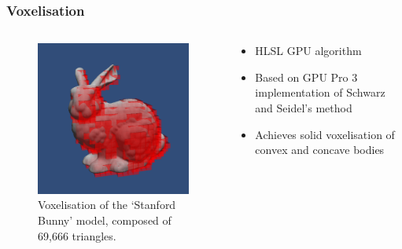 \documentclass{beamer}
\begin{document}
	\begin{frame}
	\frametitle{Voxelisation}
		\begin{columns}[T] %
			\begin{column}[T]{5cm} %
				\begin{figure}
					\centerline{\includegraphics[scale=0.4]{Voxelise.png}}
					\caption{Voxelisation of the `Stanford Bunny' model, composed of 69,666 triangles.}
				\end{figure}
			\end{column}
			\begin{column}[T]{5cm} %
				\begin{itemize}
				\item{HLSL GPU algorithm}
				\item{Based on GPU Pro 3 implementation of Schwarz and Seidel's method}
				\item{Achieves solid voxelisation of convex and concave bodies}
				\end{itemize}
			\end{column}
		\end{columns}
	\end{frame}
\end{document}
